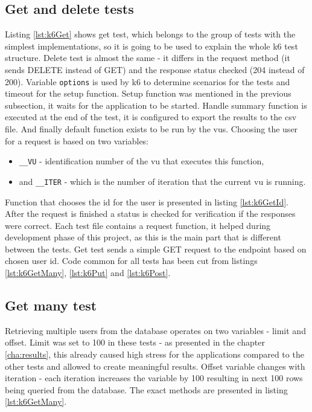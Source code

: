 \subsection{Get and delete tests}
Listing \ref{lst:k6Get} shows get test, which belongs to the group of tests with the simplest implementations, so it is going to be used to explain the whole k6 test structure.
Delete test is almost the same - it differs in the request method (it sends DELETE instead of GET) and the response status checked (204 instead of 200).
Variable \lstinline{options} is used by k6 to determine scenarios for the tests and timeout for the setup function.
Setup function was mentioned in the previous subsection, it waits for the application to be started.
Handle summary function is executed at the end of the test, it is configured to export the results to the \acrshort{csv} file.
And finally default function exists to be run by the \acrshort{vu}s. Choosing the user for a request is based on two variables:
\begin{itemize}
    \item \lstinline{__VU} - identification number of the \acrshort{vu} that executes this function,
    \item and \lstinline{__ITER} - which is the number of iteration that the current \acrshort{vu} is running.
\end{itemize}
Function that chooses the id for the user is presented in listing \ref{lst:k6GetId}.
After the request is finished a status is checked for verification if the responses were correct.
Each test file contains a request function, it helped during development phase of this project, as this is the main part that is different between the tests.
Get test sends a simple GET request to the endpoint based on chosen user id.
Code common for all tests has been cut from listings \ref{lst:k6GetMany}, \ref{lst:k6Put} and \ref{lst:k6Post}.



\subsection{Get many test}
Retrieving multiple users from the database operates on two variables - limit and offset. Limit was set to 100 in these tests - as presented in the chapter \ref{cha:results}, this already caused high stress for the applications compared to the other tests and allowed to create meaningful results. Offset variable changes with iteration - each iteration increases the variable by 100 resulting in next 100 rows being queried from the database. The exact methods are presented in listing \ref{lst:k6GetMany}.


